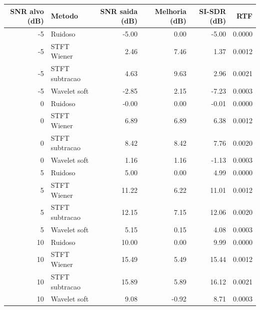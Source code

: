 \begin{tabular}{rlrrrr}
\toprule
SNR alvo (dB) & Metodo & SNR saida (dB) & Melhoria (dB) & SI-SDR (dB) & RTF \\
\midrule
-5 & Ruidoso & -5.00 & 0.00 & -5.00 & 0.0000 \\
-5 & STFT Wiener & 2.46 & 7.46 & 1.37 & 0.0012 \\
-5 & STFT subtracao & 4.63 & 9.63 & 2.96 & 0.0021 \\
-5 & Wavelet soft & -2.85 & 2.15 & -7.23 & 0.0003 \\
0 & Ruidoso & -0.00 & 0.00 & -0.01 & 0.0000 \\
0 & STFT Wiener & 6.89 & 6.89 & 6.38 & 0.0012 \\
0 & STFT subtracao & 8.42 & 8.42 & 7.76 & 0.0020 \\
0 & Wavelet soft & 1.16 & 1.16 & -1.13 & 0.0003 \\
5 & Ruidoso & 5.00 & 0.00 & 4.99 & 0.0000 \\
5 & STFT Wiener & 11.22 & 6.22 & 11.01 & 0.0012 \\
5 & STFT subtracao & 12.15 & 7.15 & 12.06 & 0.0020 \\
5 & Wavelet soft & 5.15 & 0.15 & 4.08 & 0.0003 \\
10 & Ruidoso & 10.00 & 0.00 & 9.99 & 0.0000 \\
10 & STFT Wiener & 15.49 & 5.49 & 15.44 & 0.0012 \\
10 & STFT subtracao & 15.89 & 5.89 & 16.12 & 0.0021 \\
10 & Wavelet soft & 9.08 & -0.92 & 8.71 & 0.0003 \\
\bottomrule
\end{tabular}
